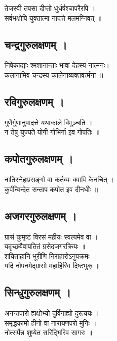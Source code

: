 तेजस्वी तपसा दीप्तो धुर्धर्षश्चापरैरपि ।\\[-2mm]
सर्वभक्षोपि युक्तात्मा नादत्ते मलमग्निवत् ॥\\

\subsection{चन्द्रगुरुलक्षणम् ।}

निषेकाद्याः श्मशानान्ताः भावा देहस्य नात्मनः।\\[-2mm]
कलानामिव चन्द्रस्य कालेनाव्यक्तवर्त्मना ॥\\

\subsection{रविगुरुलक्षणम् ।}

गुणैर्गुणानुपादत्ते यथाकाले विमुञ्चति ।\\[-2mm]
न तेषु युज्यते योगी गोभिर्गा इव गोपतिः ॥\\

\subsection{कपोतगुरुलक्षणम् ।}

नातिस्नेहःप्रसङ्गो वा कर्तव्यः क्वापि केनचित् ।\\[-2mm]
कुर्वन्विन्देत  सन्ताप कपोत इव दीनधीः ॥\\

\subsection{अजगरगुरुलक्षणम् ।}

ग्रासं कुमृष्टं विरसं महीयः स्वल्पमेव वा ।\\[-2mm]
यदृच्छयैवापतितं ग्रसेदजगरक्रियः ॥\\
शयिताहानि भूरीणि निराहारोऽनुपक्रमः ।\\[-2mm]
यदि नोपनमेद्ग्रासो महाहिरिव दिष्टभुक् ॥\\

\subsection{सिन्धुगुरुलक्षणम् ।}

अनन्तपारो ह्यक्षोभ्यो दुर्विगाह्यो दुरत्ययः ।\\[-2mm]
समृद्धकामो हीनो  वा नारायणपरो मुनिः ।\\[-2mm]
नोत्सर्पेन्न शुष्येत सरिद्भिरिव सागरः ॥\\

